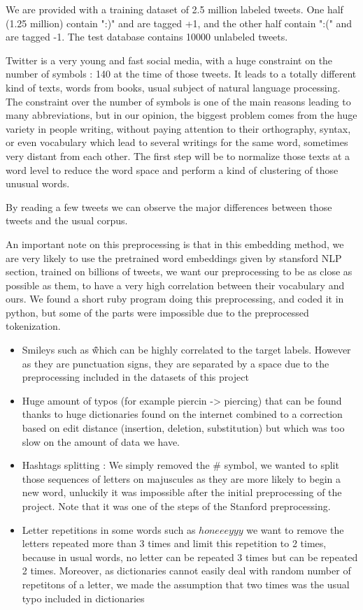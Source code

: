 \documentclass[10pt,conference,compsocconf]{IEEEtran}
\begin{document}
We are provided with a training dataset of 2.5 million labeled tweets. One half (1.25 million) contain ":)" and are tagged +1, and the other half contain ":(" and are tagged -1.
The test database contains 10000 unlabeled tweets.

Twitter is a very young and fast social media, with a huge constraint on the number of symbols : 140 at the time of those tweets. It leads to a totally different kind of texts, words from books, usual subject of natural language processing. The constraint over the number of symbols is one of the main reasons leading to many abbreviations, but in our opinion, the biggest problem comes from the huge variety in people writing, without paying attention to their orthography, syntax, or even vocabulary which lead to several writings for the same word, sometimes very distant from each other. The first step will be to normalize those texts at a word level to reduce the word space and perform a kind of clustering of those unusual words.

By reading a few tweets we can observe the major differences between those tweets and the usual corpus.

An important note on this preprocessing is that in this embedding method, we are very likely to use the pretrained word embeddings given by stansford NLP section, trained on billions of tweets, we want our preprocessing to be as close as possible as them, to have a very high correlation between their vocabulary and ours. We found a short ruby program doing this preprocessing, and coded it in python, but some of the parts were impossible due to the preprocessed tokenization.

\begin{itemize}
    \item Smileys such as \^\^  which can be highly correlated to the target labels. However as they are punctuation signs, they are separated by a space due to the preprocessing included in the datasets of this project
    \item Huge amount of typos (for example piercin -> piercing) that can be found thanks to huge dictionaries found on the internet combined to a correction based on edit distance (insertion, deletion, substitution) but which was too slow on the amount of data we have.
    \item Hashtags splitting : We simply removed the \# symbol, we wanted to split those sequences of letters on majuscules as they are more likely to begin a new word, unluckily it was impossible after the initial preprocessing of the project. Note that it was one of the steps of the Stanford preprocessing.
    \item Letter repetitions in some words such as $honeeeyyy$ we want to remove the letters repeated more than 3 times and limit this repetition to 2 times, because in usual words, no letter can be repeated 3 times but can be repeated 2 times. Moreover, as dictionaries cannot easily deal with random number of repetitons of a letter, we made the assumption that two times was the usual typo included in dictionaries
\end{itemize}
\end{document}
